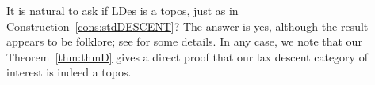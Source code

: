 \documentclass[a4paper, 11pt,reqno]{amsart}
\newcommand{\baseS}{\mathcal{S}}
\newcommand{\D}{\mathcal{D}}
\newcommand{\LDes}{\mathrm{LDes}}
\begin{document}

\begin{remark}\label{rem:LaxTopos} It is natural to ask if $\LDes$ is a topos, just as in Construction~\ref{cons:stdDESCENT}? The answer is yes, although the result appears to be folklore; see \cite[Remark B3.4.10]{Elephant} for some details. In any case, we note that our Theorem~\ref{thm:thmD} gives a direct proof that our lax descent category of interest is indeed a topos.
\end{remark}


\end{document}
